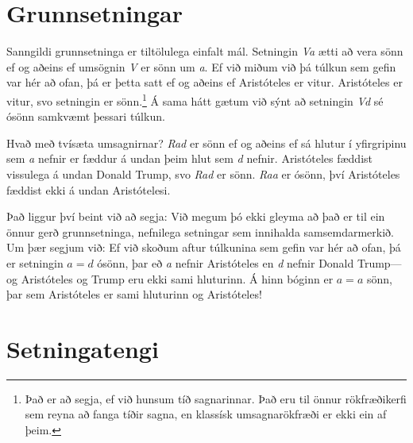 \section{Grunnsetningar}
Sanngildi grunnsetninga er tiltölulega einfalt mál. Setningin \emph{Va} ætti að vera sönn ef og aðeins ef umsögnin \emph{V} er sönn um \emph{a}. Ef við miðum við þá túlkun sem gefin var hér að ofan, þá er þetta satt ef og aðeins ef Aristóteles er vitur. Aristóteles er vitur, svo setningin er sönn.\footnote{Það er að segja, ef við hunsum tíð sagnarinnar. Það eru til önnur rökfræðikerfi sem reyna að fanga tíðir sagna, en klassísk umsagnarökfræði er ekki ein af þeim.} Á sama hátt gætum við sýnt að setningin \emph{Vd} sé ósönn samkvæmt þessari túlkun.

Hvað með tvísæta umsagnirnar? \emph{Rad} er sönn ef og aðeins ef sá hlutur í yfirgripinu sem \emph{a} nefnir er fæddur á undan þeim hlut sem \emph{d} nefnir. Aristóteles fæddist vissulega á undan Donald Trump, svo \emph{Rad} er sönn. \emph{Raa} er ósönn, því Aristóteles fæddist ekki á undan Aristótelesi.

Það liggur því beint við að segja:
Við megum þó ekki gleyma að það er til ein önnur gerð grunnsetninga, nefnilega setningar sem innihalda samsemdarmerkið. Um þær segjum við:
Ef við skoðum aftur túlkunina sem gefin var hér að ofan, þá er setningin $a = d$ ósönn, þar eð \emph{a} nefnir Aristóteles en \emph{d} nefnir Donald Trump---og Aristóteles og Trump eru ekki sami hluturinn. Á hinn bóginn er $a = a$ sönn, þar sem Aristóteles er sami hluturinn og Aristóteles!

\section{Setningatengi}

